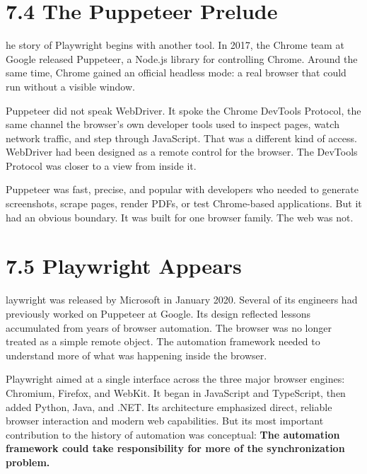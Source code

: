 \documentclass[11pt, a4paper, openany]{book}
\newcommand{\initialcap}[1]{{\fontfamily{lmss}\selectfont\huge\textbf{#1}}}
\begin{document}
\section{7.4 The Puppeteer Prelude}
\noindent \initialcap{T}he story of Playwright begins with another tool. In 2017, the Chrome team at Google released Puppeteer, a Node.js library for controlling Chrome. Around the same time, Chrome gained an official headless mode: a real browser that could run without a visible window.

Puppeteer did not speak WebDriver. It spoke the Chrome DevTools Protocol, the same channel the browser's own developer tools used to inspect pages, watch network traffic, and step through JavaScript. That was a different kind of access. WebDriver had been designed as a remote control for the browser. The DevTools Protocol was closer to a view from inside it.

Puppeteer was fast, precise, and popular with developers who needed to generate screenshots, scrape pages, render PDFs, or test Chrome-based applications. But it had an obvious boundary. It was built for one browser family. The web was not.

\section{7.5 Playwright Appears}
\noindent \initialcap{P}laywright was released by Microsoft in January 2020. Several of its engineers had previously worked on Puppeteer at Google. Its design reflected lessons accumulated from years of browser automation. The browser was no longer treated as a simple remote object. The automation framework needed to understand more of what was happening inside the browser.

Playwright aimed at a single interface across the three major browser engines: Chromium, Firefox, and WebKit. It began in JavaScript and TypeScript, then added Python, Java, and .NET. Its architecture emphasized direct, reliable browser interaction and modern web capabilities. But its most important contribution to the history of automation was conceptual: \textbf{The automation framework could take responsibility for more of the synchronization problem.}
\end{document}
